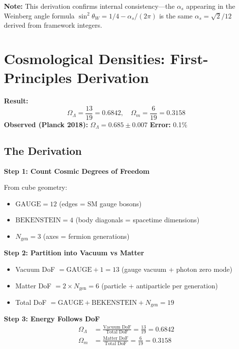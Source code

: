 \documentclass[12pt,a4paper]{article}
\newcommand{\OmegaL}{\Omega_\Lambda}
\newcommand{\OmegaM}{\Omega_m}
\newcommand{\sinW}{\sin^2\theta_W}
\newcommand{\GAUGE}{\text{GAUGE}}
\newcommand{\BEKENSTEIN}{\text{BEKENSTEIN}}
\newcommand{\Ngen}{N_{\text{gen}}}
\begin{document}
\textbf{Note:} This derivation confirms internal consistency---the $\alpha_s$ appearing in the Weinberg angle formula $\sinW = 1/4 - \alpha_s/(2\pi)$ is the same $\alpha_s = \sqrt{2}/12$ derived from framework integers.

\section{Cosmological Densities: First-Principles Derivation}
\label{sec:cosmo}

\begin{derivedbox}
\textbf{Result:}
\begin{equation}
\OmegaL = \frac{13}{19} = 0.6842, \quad \OmegaM = \frac{6}{19} = 0.3158
\end{equation}
\textbf{Observed (Planck 2018):} $\OmegaL = 0.685 \pm 0.007$ \quad \textbf{Error:} 0.1\%
\end{derivedbox}

\subsection{The Derivation}

\textbf{Step 1: Count Cosmic Degrees of Freedom}

From cube geometry:
\begin{itemize}
    \item $\GAUGE = 12$ (edges = SM gauge bosons)
    \item $\BEKENSTEIN = 4$ (body diagonals = spacetime dimensions)
    \item $\Ngen = 3$ (axes = fermion generations)
\end{itemize}

\textbf{Step 2: Partition into Vacuum vs Matter}
\begin{itemize}
    \item Vacuum DoF $= \GAUGE + 1 = 13$ (gauge vacuum + photon zero mode)
    \item Matter DoF $= 2 \times \Ngen = 6$ (particle + antiparticle per generation)
    \item Total DoF $= \GAUGE + \BEKENSTEIN + \Ngen = 19$
\end{itemize}

\textbf{Step 3: Energy Follows DoF}
\begin{align}
\OmegaL &= \frac{\text{Vacuum DoF}}{\text{Total DoF}} = \frac{13}{19} = 0.6842 \\
\OmegaM &= \frac{\text{Matter DoF}}{\text{Total DoF}} = \frac{6}{19} = 0.3158
\end{align}
\end{document}
